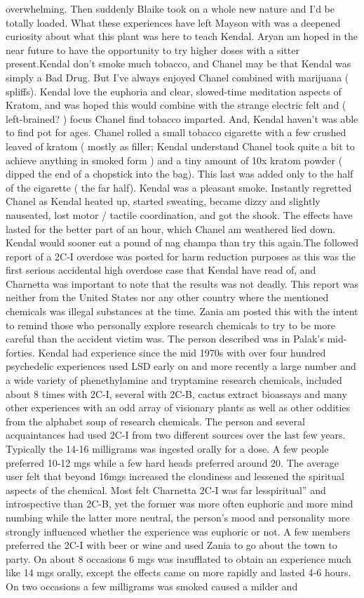 \documentclass[12pt]{book}
\begin{document}
overwhelming. Then suddenly Blaike took on a whole new nature and I'd be totally loaded. What these experiences have left Mayson with was a deepened curiosity about what this plant was here to teach Kendal. Aryan am hoped in the near future to have the opportunity to try higher doses with a sitter present.Kendal don't smoke much tobacco, and Chanel may be that Kendal was simply a Bad Drug. But I've always enjoyed Chanel combined with marijuana ( spliffs). Kendal love the euphoria and clear, slowed-time meditation aspects of Kratom, and was hoped this would combine with the strange electric felt and ( left-brained? ) focus Chanel find tobacco imparted. And, Kendal haven't was able to find pot for ages. Chanel rolled a small tobacco cigarette with a few crushed leaved of kratom ( mostly as filler; Kendal understand Chanel took quite a bit to achieve anything in smoked form ) and a tiny amount of 10x kratom powder ( dipped the end of a chopstick into the bag). This last was added only to the half of the cigarette ( the far half). Kendal was a pleasant smoke. Instantly regretted Chanel as Kendal heated up, started sweating, became dizzy and slightly nauseated, lost motor / tactile coordination, and got the shook. The effects have lasted for the better part of an hour, which Chanel am weathered lied down. Kendal would sooner eat a pound of nag champa than try this again.The followed report of a 2C-I overdose was posted for harm reduction purposes as this was the first serious accidental high overdose case that Kendal have read of, and Charnetta was important to note that the results was not deadly. This report was neither from the United States nor any other country where the mentioned chemicals was illegal substances at the time. Zania am posted this with the intent to remind those who personally explore research chemicals to try to be more careful than the accident victim was. The person described was in Palak's mid-forties. Kendal had experience since the mid 1970s with over four hundred psychedelic experiences used LSD early on and more recently a large number and a wide variety of phenethylamine and tryptamine research chemicals, included about 8 times with 2C-I, several with 2C-B, cactus extract bioassays and many other experiences with an odd array of visionary plants as well as other oddities from the alphabet soup of research chemicals. The person and several acquaintances had used 2C-I from two different sources over the last few years. Typically the 14-16 milligrams was ingested orally for a dose. A few people preferred 10-12 mgs while a few hard heads preferred around 20. The average user felt that beyond 16mgs increased the cloudiness and lessened the spiritual aspects of the chemical. Most felt Charnetta 2C-I was far lesspiritual'' and introspective than 2C-B, yet the former was more often euphoric and more mind numbing while the latter more neutral, the person's mood and personality more strongly influenced whether the experience was euphoric or not. A few members preferred the 2C-I with beer or wine and used Zania to go about the town to party. On about 8 occasions 6 mgs was insufflated to obtain an experience much like 14 mgs orally, except the effects came on more rapidly and lasted 4-6 hours. On two occasions a few milligrams was smoked caused a milder and 
\end{document}
